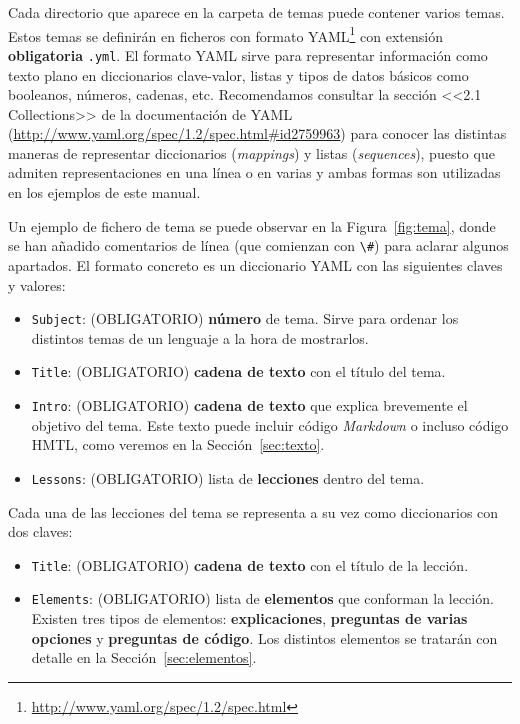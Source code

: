 \documentclass[]{article}
\newcommand{\code}[1]{{\lstinline[basicstyle=\ttfamily,mathescape]!#1!}}
\begin{document}
Cada directorio que aparece en la carpeta de temas puede contener varios temas. Estos temas se definirán en ficheros con formato YAML\footnote{\url{http://www.yaml.org/spec/1.2/spec.html}} con extensión \textbf{obligatoria} \code{.yml}. El formato YAML 
sirve para representar información como texto plano en diccionarios clave-valor, listas y tipos de datos básicos como booleanos, números, cadenas, etc.
Recomendamos consultar la sección <<2.1 Collections>> de la documentación de YAML (\url{http://www.yaml.org/spec/1.2/spec.html#id2759963}) para conocer las distintas maneras de representar diccionarios (\emph{mappings}) y listas (\emph{sequences}), puesto que admiten representaciones en una línea o en varias y ambas formas son utilizadas en los ejemplos de este manual.

Un ejemplo de fichero de tema se puede observar en la Figura~\ref{fig:tema}, %
donde se han añadido comentarios de línea (que comienzan con \code{\#}) para aclarar algunos apartados. El formato concreto es un diccionario YAML con las siguientes claves y valores:
\begin{itemize}
\item \code{Subject}: {\sf (OBLIGATORIO)} \textbf{número} de tema. Sirve para ordenar los distintos temas de un lenguaje a la hora de mostrarlos.
\item \code{Title}: {\sf (OBLIGATORIO)} \textbf{cadena de texto} con el título del tema. 
\item \code{Intro}: {\sf (OBLIGATORIO)} \textbf{cadena de texto} que explica brevemente el objetivo del tema. Este texto puede incluir código \emph{Markdown} o incluso código HMTL, como veremos en la Sección~\ref{sec:texto}.
\item \code{Lessons}: {\sf (OBLIGATORIO)} lista de \textbf{lecciones} dentro del tema.
\end{itemize}

Cada una de las lecciones del tema se representa a su vez como diccionarios con dos claves:
\begin{itemize}
\item \code{Title}: {\sf (OBLIGATORIO)} \textbf{cadena de texto} con el título de la lección.
\item \code{Elements}: {\sf (OBLIGATORIO)}  lista de \textbf{elementos} que conforman la lección. Existen tres tipos de elementos: \textbf{explicaciones}, \textbf{preguntas de varias opciones} y \textbf{preguntas de código}. Los distintos elementos se tratarán con detalle en la Sección~\ref{sec:elementos}.
\end{itemize}
\end{document}
